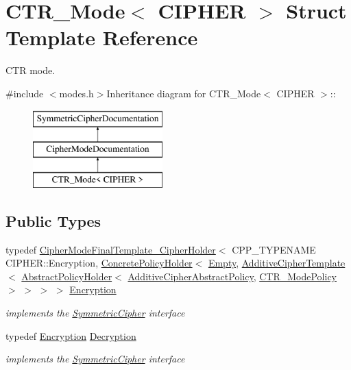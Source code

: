 \hypertarget{struct_c_t_r___mode}{
\section{CTR\_\-Mode$<$ CIPHER $>$ Struct Template Reference}
\label{struct_c_t_r___mode}
}


CTR mode.  


{\ttfamily \#include $<$modes.h$>$}Inheritance diagram for CTR\_\-Mode$<$ CIPHER $>$::\begin{figure}[H]
\begin{center}
\leavevmode
\includegraphics[height=3cm]{struct_c_t_r___mode}
\end{center}
\end{figure}
\subsection*{Public Types}
\begin{DoxyCompactItemize}
\item 
\hypertarget{struct_c_t_r___mode_ac417f89e485f98671f85b5e9ef9f0a30}{
typedef \hyperlink{class_cipher_mode_final_template___cipher_holder}{CipherModeFinalTemplate\_\-CipherHolder}$<$ CPP\_\-TYPENAME CIPHER::Encryption, \hyperlink{class_concrete_policy_holder}{ConcretePolicyHolder}$<$ \hyperlink{class_empty}{Empty}, \hyperlink{class_additive_cipher_template}{AdditiveCipherTemplate}$<$ \hyperlink{class_abstract_policy_holder}{AbstractPolicyHolder}$<$ \hyperlink{struct_additive_cipher_abstract_policy}{AdditiveCipherAbstractPolicy}, \hyperlink{class_c_t_r___mode_policy}{CTR\_\-ModePolicy} $>$ $>$ $>$ $>$ \hyperlink{struct_c_t_r___mode_ac417f89e485f98671f85b5e9ef9f0a30}{Encryption}}
\label{struct_c_t_r___mode_ac417f89e485f98671f85b5e9ef9f0a30}

\begin{DoxyCompactList}\small\item\em implements the \hyperlink{class_symmetric_cipher}{SymmetricCipher} interface \item\end{DoxyCompactList}\item 
\hypertarget{struct_c_t_r___mode_aa03cbe2f81ebbf2caf030f1f3f71d845}{
typedef \hyperlink{class_cipher_mode_final_template___cipher_holder}{Encryption} \hyperlink{struct_c_t_r___mode_aa03cbe2f81ebbf2caf030f1f3f71d845}{Decryption}}
\label{struct_c_t_r___mode_aa03cbe2f81ebbf2caf030f1f3f71d845}

\begin{DoxyCompactList}\small\item\em implements the \hyperlink{class_symmetric_cipher}{SymmetricCipher} interface \item\end{DoxyCompactList}\end{DoxyCompactItemize}


